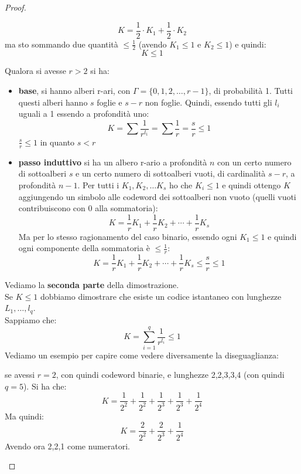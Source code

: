 \documentclass[a4paper,12pt, oneside]{book}
\begin{document}
\begin{proof}
\begin{itemize}
    \[K=\frac{1}{2}\cdot K_1+\frac{1}{2}\cdot K_2\]
    ma sto sommando due quantità $\leq \frac{1}{2}$ (avendo $K_1\leq 1$ e
    $K_2\leq 1$) e quindi: 
    \[K\leq 1\]
  \end{itemize}
  Qualora si avesse $r>2$ si ha:
  \begin{itemize}
    \item \textbf{base}, si hanno alberi r-ari, con
    $\Gamma=\{0,1,2,\ldots,r-1\}$, di probabilità 1. Tutti questi alberi hanno
    $s$ foglie e $s-r$ non foglie. Quindi, essendo tutti gli $l_i$ uguali a 1
    essendo a profondità uno:
    \[K=\sum \frac{1}{r^{l_1}}=\sum \frac{1}{r}=\frac{s}{r}\leq 1\]
    $\frac{s}{r}\leq 1$ in quanto $s<r$
    \item \textbf{passo induttivo} si ha un albero r-ario a profondità $n$ con
    un certo numero di sottoalberi $s$ e un certo numero di sottoalberi vuoti,
    di cardinalità $s-r$, a profondità $n-1$. Per tutti i $K_1,K_2,\ldots K_s$
    ho che $K_i\leq 1$ e quindi ottengo $K$ aggiungendo un simbolo alle codeword 
    dei sottoalberi non vuoto (quelli vuoti contribuiscono con 0 alla
    sommatoria): 
    \[K=\frac{1}{r}K_1+\frac{1}{r}K_2+\cdots+\frac{1}{r}K_s\]
    Ma per lo stesso ragionamento del caso binario, essendo ogni $K_1\leq 1$ e
    quindi ogni componente della sommatoria è $\leq \frac{1}{r}$:
    \[K=\frac{1}{r}K_1+\frac{1}{r}K_2+\cdots+\frac{1}{r}K_s\leq \frac{s}{r}\leq
      1\] 
  \end{itemize}
  Vediamo la \textbf{seconda parte} della dimostrazione.\\
  Se $K\leq 1$ dobbiamo dimostrare che esiste un codice istantaneo con lunghezze
  $L_1,\ldots, l_q$.\\
  Sappiamo che:
  \[K=\sum_{i=1}^q\frac{1}{r^{l_i}}\leq 1\]
  Vediamo un esempio per capire come vedere diversamente la diseguaglianza:
  \begin{esempio}
    se avessi $r=2$, con quindi codeword binarie, e lunghezze 2,2,3,3,4 (con
    quindi $q=5$). Si ha che: 
    \[K=\frac{1}{2^2}+\frac{1}{2^2}+\frac{1}{2^3}+\frac{1}{2^3}+\frac{1}{2^4}\]
    Ma quindi:
    \[K=\frac{2}{2^2}+\frac{2}{2^3}+\frac{1}{2^4}\]
    Avendo ora 2,2,1 come numeratori.
  \end{esempio}


\end{proof}
\end{document}

